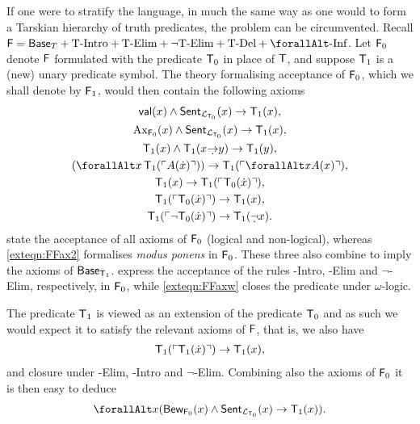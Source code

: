 \documentclass[UKenglish,cleveref,DIV=12]{scrartcl}
\let\forall\forallAlt
\theoremstyle{definition}
\theoremstyle{definition}
\begin{document}
If one were to stratify the language, in much the same way as one would to form a Tarskian hierarchy of truth predicates, the problem can be circumvented. Recall $\F=\BaseT+\text{T-Intro}+\text{T-Elim}+\text{$\lnot$T-Elim}+\text{T-Del}+\text{$\forall$-Inf}$. Let $\mathsf{F}_0$ denote $\mathsf{F}$ formulated with the predicate $\mathsf{T}_0$ in place of $\mathsf{T}$, and suppose $\mathsf{T}_1$ is a (new) unary predicate symbol. The theory formalising acceptance of $\mathsf{F}_0$, which we shall denote by $\mathsf{F}_1$, would then contain the following axioms
\begin{gather}
  \valid(x)\land\Sent_{\L_{\T_0}}(x)\rightarrow \T_1(x),\label{exteqn:FFax0}\\
  \set{Ax}_{\F_0}(x)\land\Sent_{\L_{\T_0}}(x)\rightarrow \T_1(x),\label{exteqn:FFax1}\\
  \T_1(x)\land \T_1(x\dimplies y)\rightarrow \T_1(y),\label{exteqn:FFax2}\\
  (\forall x\,\T_1(\gn{A(\dot x)}))\rightarrow \T_1(\gn{\forall xA(x)}),\label{exteqn:FFaxw}\\
  \T_1(x)\rightarrow \T_1(\gn{\T_0(\dot x)}),\label{exteqn:FFax3}\\
  \T_1(\gn{\T_0(\dot x)})\rightarrow \T_1(x),\label{exteqn:FFax4}\\
  \T_1(\gn{\lnot \T_0(\dot x)})\rightarrow \T_1(\dlnot x).\label{exteqn:FFax5}
\end{gather}
 state the acceptance of all axioms of $\mathsf{F}_0$ (logical and non-logical), whereas \cref{exteqn:FFax2} formalises {\em modus ponens} in $\mathsf{F}_0$. These three also combine to imply the axioms of $\mathsf{Base}_{\mathsf{T}_1}$.  express the acceptance of the rules -Intro, -Elim and
$\lnot$-Elim, respectively, in $\mathsf{F}_0$, while \cref{exteqn:FFaxw} closes the
predicate under $\omega$-logic.

The predicate $\mathsf{T}_1$ is viewed as an extension of the predicate $\mathsf{T}_0$ and as such
we would expect it to satisfy the relevant axioms of $\mathsf{F}$, that is, we also have %
\begin{gather*}%
 \T_1(\gn{\T_1(\dot x)})\rightarrow \T_1(x),
\end{gather*}
and closure under -Elim, -Intro and $\lnot$-Elim. Combining
also the axioms of $\mathsf{F}_0$ it is then easy to deduce
\begin{align}\label{exteqn:F1reflection}
  \forall x( \Prov_{\F_0}(x)\land\Sent_{\L_{\T_0}}(x)\rightarrow \T_1(x)).
\end{align}
\end{document}
